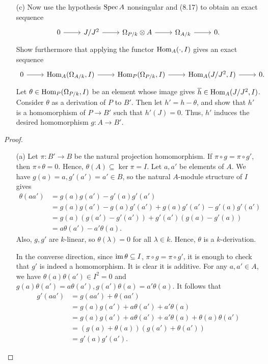 \documentclass{article}
\begin{document}
\begin{enumerate} [label=\textbf{\arabic*.}, leftmargin=0em]
\begin{itemize}
    \item[(c)] Now use the hypothesis $\operatorname{Spec}{A}$ nonsingular and (8.17) to obtain an exact sequence
    \[ \begin{tikzcd}
        0 \arrow[r] & {J/J^2} \arrow[r] & {\Omega_{P/k} \otimes A} \arrow[r] & {\Omega_{A/k}} \arrow[r] & 0.
        \end{tikzcd} \]
    Show furthermore that applying the functor $\operatorname{Hom}_A(\cdot, I)$ gives an exact sequence
    \[ \begin{tikzcd}
        0 \arrow[r] & {\Hom_A(\Omega_{A/k},I)} \arrow[r] & {\Hom_P(\Omega_{P/k},I)} \arrow[r] & {\Hom_A(J/J^2,I)} \arrow[r] & 0.
        \end{tikzcd} \]
    Let $\theta \in \operatorname{Hom}_P(\Omega_{P/k}, I)$ be an element whose image gives $\overline{h} \in \operatorname{Hom}_A(J/J^2, I)$. Consider $\theta$ as a derivation of $P$ to $B'$. Then let $h' = h - \theta$, and show that $h'$ is a homomorphism of $P \to B'$ such that $h'(J) = 0$. Thus, $h'$ induces the desired homomorphism $g : A \to B'$.
\end{itemize}

\begin{proof} $ $ \vspace{0pt}
\begin{itemize} [leftmargin=0cm]
\item[(a)] Let $\pi : B' \to B$ be the natural projection homomorphism. If $\pi \circ g = \pi \circ g'$, then $\pi \circ \theta = 0$. Hence, $\theta(A) \subseteq \ker{\pi} = I$. Let $a, a'$ be elements of $A$. We have $g(a) = a, g'(a') = a' \in B$, so the natural $A$-module structure of $I$ gives
\begin{align*}
    \theta(aa') & = g(a)g(a') - g'(a)g'(a') \\
    & = g(a) g(a') - g(a) g'(a') + g(a) g'(a') - g'(a) g'(a') \\
    & = g(a) (g(a') - g'(a')) + g'(a')(g(a) - g'(a)) \\
    & = a \theta(a') - a' \theta(a).
\end{align*}
Also, $g, g'$ are $k$-linear, so $\theta(\lambda) = 0$ for all $\lambda \in k$. Hence, $\theta$ is a $k$-derivation.

In the converse direction, since $\operatorname{im}{\theta} \subseteq I$, $\pi \circ g = \pi \circ g'$, it is enough to check that $g'$ is indeed a homomorphism. It is clear it is additive. For any $a, a' \in A$, we have $\theta(a)\theta(a') \in I^2 = 0$ and $g(a)\theta(a') = a\theta(a'), g(a')\theta(a) = a'\theta(a)$. It follows that
\begin{align*}
    g'(aa') & = g(aa') + \theta(aa') \\
    & = g(a)g(a') + a\theta(a') + a'\theta(a) \\
    & = g(a)g(a') + a\theta(a') + a'\theta(a) + \theta(a) \theta(a') \\
    & = (g(a) + \theta(a))(g(a') + \theta(a')) \\
    & = g'(a)g'(a').
\end{align*}


\end{itemize}
\end{proof}
\end{enumerate}
\end{document}
